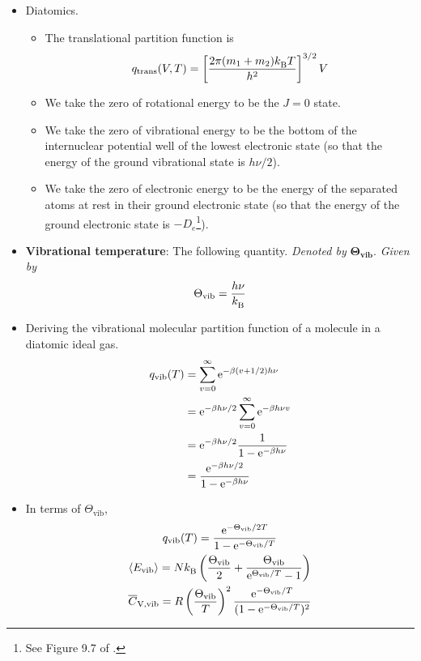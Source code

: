 \documentclass[../notes.tex]{subfiles}
\begin{document}
\begin{itemize}
    \item Diatomics.
    \begin{itemize}
        \item The translational partition function is
        \begin{equation*}
            q_\text{trans}(V,T) = \left[ \frac{2\pi(m_1+m_2)\kB T}{h^2} \right]^{3/2}V
        \end{equation*}
        \item We take the zero of rotational energy to be the $J=0$ state.
        \item We take the zero of vibrational energy to be the bottom of the internuclear potential well of the lowest electronic state (so that the energy of the ground vibrational state is $h\nu/2$).
        \item We take the zero of electronic energy to be the energy of the separated atoms at rest in their ground electronic state (so that the energy of the ground electronic state is $-D_e$\footnote{See Figure 9.7 of \textcite{bib:CHEM26100Notes}.}).
    \end{itemize}
    \item \textbf{Vibrational temperature}: The following quantity. \emph{Denoted by} $\bm{\Theta_\text{vib}}$. \emph{Given by}
    \begin{equation*}
        \Theta_\text{vib} = \frac{h\nu}{\kB}
    \end{equation*}
    \item Deriving the vibrational molecular partition function of a molecule in a diatomic ideal gas.
    \begin{align*}
        q_\text{vib}(T) &= \sum_{v=0}^\infty\e[-\beta(v+1/2)h\nu]\\
        &= \e[-\beta h\nu/2]\sum_{v=0}^\infty\e[-\beta h\nu v]\\
        &= \e[-\beta h\nu/2]\frac{1}{1-\e[-\beta h\nu]}\\
        &= \frac{\e[-\beta h\nu/2]}{1-\e[-\beta h\nu]}
    \end{align*}
    \item In terms of $\Theta_\text{vib}$,
    \begin{gather*}
        q_\text{vib}(T) = \frac{\e[-\Theta_\text{vib}/2T]}{1-\e[-\Theta_\text{vib}/T]}\\
        \prb{E_\text{vib}} = N\kB\left( \frac{\Theta_\text{vib}}{2}+\frac{\Theta_\text{vib}}{\e[\Theta_\text{vib}/T]-1} \right)\\
        \overline{C}_\text{V,\text{vib}} = R\left( \frac{\Theta_\text{vib}}{T} \right)^2\frac{\e[-\Theta_\text{vib}/T]}{(1-\e[-\Theta_\text{vib}/T])^2}

\end{gather*}
\end{itemize}
\end{document}
